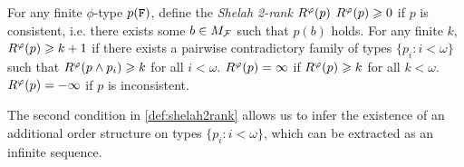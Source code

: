 \begin{definition}
\label{def:shelah2rank}
\begin{outline}
\0 For any finite $\phi$-type $p(\texttt{F})$, define the \emph{Shelah 2-rank} $R^\varphi(p)$ 
    \1[1)] $R^\varphi(p) \geqslant 0$ if $p$ is consistent, i.e. there exists some $b\in M_{\mathcal{F}}$ such that $p(b)$ holds.
    \1[2)] For any finite $k$, $R^\varphi(p) \geqslant k + 1$ if there exists a pairwise contradictory family of types $\{p_i : i<\omega\}$ such that $R^\varphi(p \land p_i) \geqslant k$ for all $i<\omega$.
    \1[3)] $R^\varphi(p)=\infty$ if $R^\varphi(p)\geqslant k$ for all $k < \omega$.
    \1[4)] $R^\varphi(p) = -\infty$ if $p$ is inconsistent.
\end{outline}
\end{definition}

The second condition in \cref{def:shelah2rank} allows us to infer the existence of an additional order structure on types $\{p_i : i<\omega\}$, which can be extracted as an infinite sequence.

